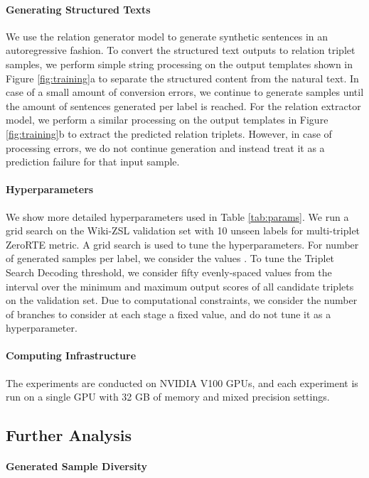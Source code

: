 \documentclass[11pt]{article}
\begin{document}
\paragraph{Generating Structured Texts}
We use the relation generator model to generate synthetic sentences in an autoregressive fashion.
To convert the structured text outputs to relation triplet samples, we perform simple string processing on the output templates shown in Figure \ref{fig:training}a to separate the structured content from the natural text.
In case of a small amount of conversion errors, we continue to generate samples until the amount of sentences generated per label is reached.
For the relation extractor model, we perform a similar processing on the output templates in Figure \ref{fig:training}b to extract the predicted relation triplets.
However, in case of processing errors, we do not continue generation and instead treat it as a prediction failure for that input sample.

\paragraph{Hyperparameters}
We show more detailed hyperparameters used in Table \ref{tab:params}. 
We run a grid search on the Wiki-ZSL validation set with 10 unseen labels for multi-triplet ZeroRTE  metric.
A grid search is used to tune the hyperparameters.
For number of generated samples per label, we consider the values .
To tune the Triplet Search Decoding threshold, we consider fifty evenly-spaced values from the interval over the minimum and maximum output scores of all candidate triplets on the validation set.
Due to computational constraints, we consider the number of branches to consider at each stage a fixed value, and do not tune it as a hyperparameter.

\paragraph{Computing Infrastructure}
The experiments are conducted on NVIDIA V100 GPUs, and each experiment is run on a single GPU with 32 GB of memory and mixed precision settings.

\subsection{Further Analysis}
\label{sec:further_analysis}
\paragraph{Generated Sample Diversity}
\end{document}
